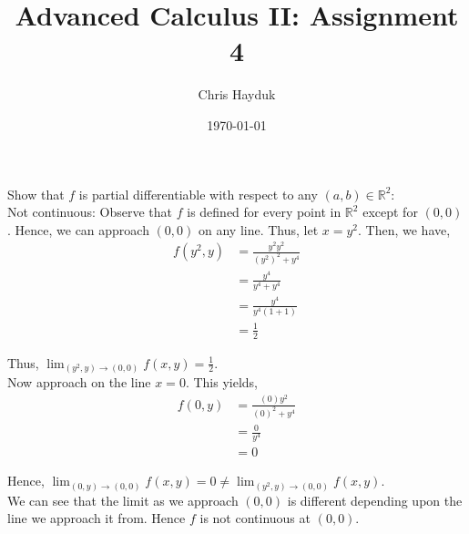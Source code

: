\documentclass[12pt]{article}
\newenvironment{problem}[2][Problem]{\begin{trivlist}
\item[\hskip \labelsep {\bfseries #1}\hskip \labelsep {\bfseries #2.}]}{\end{trivlist}}
\begin{document}
\title{Advanced Calculus II: Assignment 4}

\author{Chris Hayduk}
\date{\today}

\maketitle

\begin{problem}{1}
\end{problem}

\begin{problem}{2}
\end{problem}

\begin{problem}{3}
\end{problem}

Show that $f$ is partial differentiable with respect to any $(a, b) \in \mathbb{R}^2$:\\

Not continuous: Observe that $f$ is defined for every point in $\mathbb{R}^2$ except for $(0, 0)$. Hence, we can approach $(0, 0)$ on any line. Thus, let $x = y^2$. Then, we have,
\begin{align*}
f(y^2, y) &= \frac{y^2y^2}{(y^2)^2 + y^4}\\
&= \frac{y^4}{y^4 + y^4}\\
&= \frac{y^4}{y^4(1 + 1)}\\
&= \frac{1}{2}
\end{align*}

Thus, $\lim_{(y^2, y) \to (0, 0)} f(x, y) = \frac{1}{2}$.\\

Now approach on the line $x = 0$. This yields,
\begin{align*}
f(0, y) &= \frac{(0)y^2}{(0)^2 + y^4}\\
&= \frac{0}{y^4}\\
&= 0
\end{align*}

Hence, $\lim_{(0, y) \to (0, 0)} f(x, y) = 0 \neq \lim_{(y^2, y) \to (0, 0)} f(x, y)$.\\

We can see that the limit as we approach $(0, 0)$ is different depending upon the line we approach it from. Hence $f$ is not continuous at $(0, 0)$.

\begin{problem}{4}
\end{problem}

\begin{problem}{5}
\end{problem}
\end{document}
